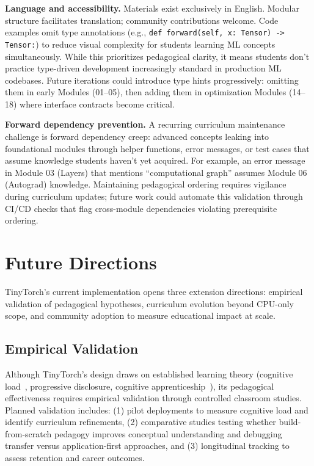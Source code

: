 \documentclass[10pt,twocolumn]{article}
\begin{document}
\textbf{Language and accessibility.} Materials exist exclusively in English. Modular structure facilitates translation; community contributions welcome. Code examples omit type annotations (e.g., \texttt{def forward(self, x: Tensor) -> Tensor:}) to reduce visual complexity for students learning ML concepts simultaneously. While this prioritizes pedagogical clarity, it means students don't practice type-driven development increasingly standard in production ML codebases. Future iterations could introduce type hints progressively: omitting them in early Modules (01--05), then adding them in optimization Modules (14--18) where interface contracts become critical.

\textbf{Forward dependency prevention.} A recurring curriculum maintenance challenge is forward dependency creep: advanced concepts leaking into foundational modules through helper functions, error messages, or test cases that assume knowledge students haven't yet acquired. For example, an error message in Module 03 (Layers) that mentions ``computational graph'' assumes Module 06 (Autograd) knowledge. Maintaining pedagogical ordering requires vigilance during curriculum updates; future work could automate this validation through CI/CD checks that flag cross-module dependencies violating prerequisite ordering.

\section{Future Directions}
\label{sec:future-work}

TinyTorch's current implementation opens three extension directions: empirical validation of pedagogical hypotheses, curriculum evolution beyond CPU-only scope, and community adoption to measure educational impact at scale.

\subsection{Empirical Validation}

Although TinyTorch's design draws on established learning theory (cognitive load~\citep{sweller1988}, progressive disclosure, cognitive apprenticeship~\citep{collins1989apprenticeship}), its pedagogical effectiveness requires empirical validation through controlled classroom studies. Planned validation includes: (1) pilot deployments to measure cognitive load and identify curriculum refinements, (2) comparative studies testing whether build-from-scratch pedagogy improves conceptual understanding and debugging transfer versus application-first approaches, and (3) longitudinal tracking to assess retention and career outcomes.
\end{document}
